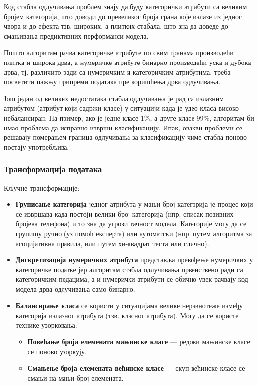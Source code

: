 Код стабла одлучивања проблем знају да буду категорички атрибути са великим бројем категорија, што доводи до превеликог броја грана које излазе из једног чвора и до ефекта тзв. широких, а плитких стабала, што зна да доведе до смањивања предиктивних перформанси модела.

Пошто алгоритам рачва категоричке атрибуте по свим гранама производећи плитка и широка дрва, а нумеричке атрибуте бинарно производећи уска и дубока дрва, тј. различито ради са нумеричким и категоричким атрибутима, треба посветити пажњу припреми података пре коришћења дрва одлучивања.

Још један од великих недостатака стабла одлучивања је рад са излазним атрибутом (атрибут који садржи класе) у ситуацији када је удео класа високо небалансиран. На пример, ако је једне класе 1\%, а друге класе 99\%, алгоритам би имао проблема да исправно изврши класификацију. Ипак, овакви проблеми се решавају померањем граница одлучивања за класификацију чиме стабла поново постају употребљива.

\subsubsection{Трансформација података}
Кључне трансформације:

\begin{itemize}
  \item \textbf{Груписање категорија} једног атрибута у мањи број категорија је процес који се извршава када постоји велики број категорија (нпр. списак позивних бројева телефона) и то зна да угрози тачност модела. Категорије могу да се групишу ручно (уз помоћ експерта) или аутоматски (нпр. путем алгоритма за асоцијативна правила, или путем хи-квадрат теста или слично).
  \item \textbf{Дискретизација нумеричких атрибута} представља превођење нумеричких у категоричке податке јер алгоритам стабла одлучивања првенствено ради са категоричким подацима, а и нумерички атрибути се обично увек рачвају код модела дрва одлучивања само бинарно.
  \item \textbf{Балансирање класа} се користи у ситуацијама велике неравнотеже између категорија излазног атрибута (тзв. класног атрибута). Могу да се користе технике узорковања:
  \begin{itemize}
    \item \textbf{Повећање броја елемената мањинске класе} — редови мањинске класе се поново узоркују.
    \item \textbf{Смањење броја елемената већинске класе} — скуп већинске класе се смањи на мањи број елемената.
  \end{itemize}
\end{itemize}

